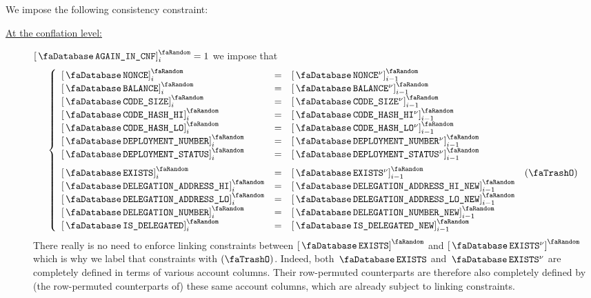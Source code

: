 We impose the following consistency constraint:
\begin{description}
	\item[\underline{At the conflation level:}]
		\If $\accAgainInConflation_{i} = 1$
		\Then we impose that
		\[
			\left\{ \begin{array}{lclr}
				\order{\accNonce               } _{i} & = & \order{\accNonce                  \new} _{i - 1} \\
				\order{\accBalance             } _{i} & = & \order{\accBalance                \new} _{i - 1} \\
				\order{\accCodesize            } _{i} & = & \order{\accCodesize               \new} _{i - 1} \\
				\order{\accCodehashHi          } _{i} & = & \order{\accCodehashHi             \new} _{i - 1} \\
				\order{\accCodehashLo          } _{i} & = & \order{\accCodehashLo             \new} _{i - 1} \\
				\order{\accDeploymentNumber    } _{i} & = & \order{\accDeploymentNumber       \new} _{i - 1} \\
				\order{\accDeploymentStatus    } _{i} & = & \order{\accDeploymentStatus       \new} _{i - 1} \vspace{2mm} \\
				\order{\accExists              } _{i} & = & \order{\accExists                 \new} _{i - 1} &            (\trash) \\
				\order{\accDelegationAddressHi } _{i} & = & \order{\accDelegationAddressHiNew }     _{i - 1} \\
				\order{\accDelegationAddressLo } _{i} & = & \order{\accDelegationAddressLoNew }     _{i - 1} \\
				\order{\accDelegationNumber    } _{i} & = & \order{\accDelegationNumberNew    }     _{i - 1} \\
				\order{\accIsDelegated         } _{i} & = & \order{\accIsDelegatedNew         }     _{i - 1} \\
			\end{array} \right.
		\]
		\saNote{}
		There really is no need to enforce linking constraints between $\order{\accExists}$ and $\order{\accExists \new}$
		which is why we label that constraints with $(\trash)$.
		Indeed, both $\accExists$ and $\accExists \new$ are completely defined in terms of various account columns.
		Their row-permuted counterparts are therefore also completely defined by (the row-permuted counterparts of) these same account columns,
		which are already subject to linking constraints.


\end{description}
